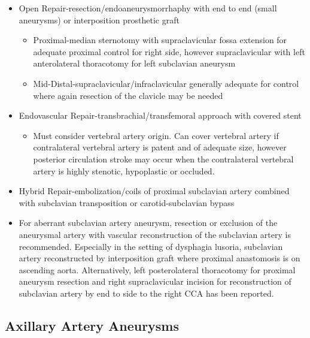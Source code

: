 \documentclass[
]{book}
\providecommand{\tightlist}{%
  \setlength{\itemsep}{0pt}\setlength{\parskip}{0pt}}
\begin{document}
\begin{itemize}
\item
  Open Repair-resection/endoaneurysmorrhaphy with end to end (small
  aneurysms) or interposition prosthetic graft\citep{vierhout2010}

  \begin{itemize}
  \item
    Proximal-median sternotomy with supraclavicular fossa extension
    for adequate proximal control for right side, however
    supraclavicular with left anterolateral thoracotomy for left
    subclavian aneurysm
  \item
    Mid-Distal-supraclavicular/infraclavicular generally adequate
    for control where again resection of the clavicle may be needed
  \end{itemize}
\item
  Endovascular Repair-transbrachial/transfemoral approach with covered
  stent\citep{maskanakis2018}

  \begin{itemize}
  \tightlist
  \item
    Must consider vertebral artery origin. Can cover vertebral
    artery if contralateral vertebral artery is patent and of
    adequate size, however posterior circulation stroke may occur
    when the contralateral vertebral artery is highly stenotic,
    hypoplastic or occluded.
  \end{itemize}
\item
  Hybrid Repair-embolization/coils of proximal subclavian artery
  combined with subclavian transposition or carotid-subclavian bypass
\item
  For aberrant subclavian artery aneurysm, resection or exclusion of
  the aneurysmal artery with vascular reconstruction of the subclavian
  artery is recommended. Especially in the setting of dysphagia
  lusoria, subclavian artery reconstructed by interposition graft
  where proximal anastomosis is on ascending aorta. Alternatively,
  left posterolateral thoracotomy for proximal aneurysm resection and
  right supraclavicular incision for reconstruction of subclavian
  artery by end to side to the right CCA has been reported.
\end{itemize}

\hypertarget{axillary-artery-aneurysms}{%
\subsection{Axillary Artery Aneurysms}\label{axillary-artery-aneurysms}}
\end{document}
